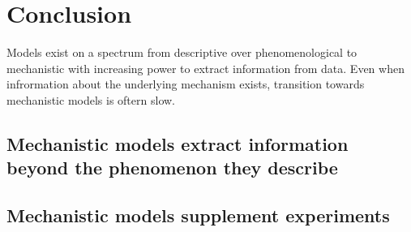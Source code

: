 \chapter{Conclusion} \label{ch:conclusion}
Models exist on a spectrum from descriptive over phenomenological to mechanistic with increasing power to extract information from data.
Even when infrormation about the underlying mechanism exists, transition towards mechanistic models is oftern slow.


\section{Mechanistic models extract information beyond the phenomenon they describe}

\section{Mechanistic models supplement experiments}


